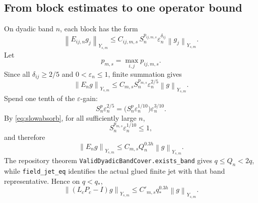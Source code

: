 \documentclass[11pt]{article}
\numberwithin{equation}{section}
\newcommand{\eps}{\varepsilon}
\newcommand{\norm}[1]{\left\lVert #1\right\rVert}
\begin{document}
\subsection{From block estimates to one operator bound}
On dyadic band \(n\), each block has the form
\begin{equation}
\norm{E_{ij,n}g_j}_{Y_{s,m}}
\le C_{ij,m,s}\,S_n^{p_{ij,m,s}}\eps_n^{\delta_{ij}}\norm{g_j}_{Y_{s,m}}.
\label{eq:blockest}
\end{equation}
Let
\begin{equation}
p_{m,s}=\max_{i,j}p_{ij,m,s}.
\label{eq:pmax}
\end{equation}
Since all \(\delta_{ij}\ge2/5\) and \(0<\eps_n\le1\), finite summation gives
\begin{equation}
\norm{E_ng}_{Y_{s,m}}
\le C_{m,s}S_n^{p_{m,s}}\eps_n^{2/5}\norm g_{Y_{s,m}}.
\label{eq:localdefect}
\end{equation}
Spend one tenth of the \(\eps\)-gain:
\begin{equation}
S_n^p\eps_n^{2/5}
=\bigl(S_n^p\eps_n^{1/10}\bigr)\eps_n^{3/10}.
\label{eq:spend}
\end{equation}
By \eqref{eq:slowabsorb}, for all sufficiently large \(n\),
\begin{equation}
S_n^{p_{m,s}}\eps_n^{1/10}\le1,
\label{eq:absorb}
\end{equation}
and therefore
\begin{equation}
\norm{E_ng}_{Y_{s,m}}
\le C_{m,s}Q_n^{0.3h}\norm g_{Y_{s,m}}.
\label{eq:banddefect}
\end{equation}
The repository theorem \texttt{ValidDyadicBandCover.exists\_band} gives \(q\le Q_n<2q\), while \texttt{field\_jet\_eq} identifies the actual glued finite jet with that band representative.  Hence on \(q<q_*\),
\begin{equation}
\boxed{
\norm{(L_cP_c-I)g}_{Y_{s,m}}
\le C'_{m,s}q_*^{0.3h}\norm g_{Y_{s,m}}.}
\label{eq:globaldefect}
\end{equation}
\end{document}

